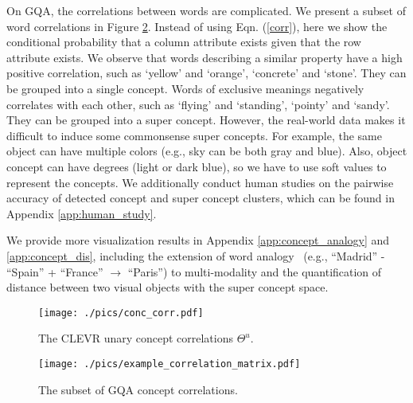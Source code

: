 \documentclass[10pt,twocolumn,letterpaper]{article}
\begin{document}
On GQA, the correlations between words are complicated. We present a subset of word correlations in Figure \ref{conc_corr_gqa}. Instead of using Eqn. (\ref{corr}), here we show the conditional probability that a column attribute exists given that the row attribute exists. We observe that words describing a similar property have a high positive correlation, such as `yellow' and `orange', `concrete' and `stone'. They can be grouped into a single concept. Words of exclusive meanings negatively correlates with each other, such as `flying' and `standing', `pointy' and `sandy'. They can be grouped into a super concept. However, the real-world data makes it difficult to induce some commonsense super concepts. For example, the same object can have multiple colors (e.g., sky can be both gray and blue). Also, object concept can have degrees (light or dark blue), so we have to use soft values to represent the concepts. We additionally conduct human studies on the pairwise accuracy of detected concept and super concept clusters, which can be found in Appendix \ref{app:human_study}.


We provide more visualization results in Appendix \ref{app:concept_analogy} and  \ref{app:concept_dis}, including the extension of word analogy~\cite{mikolov2013distributed} (e.g., ``Madrid'' - ``Spain'' + ``France'' $\rightarrow$ ``Paris'') to multi-modality and the quantification of distance between two visual objects with the super concept space.




\begin{figure}[t]
\centering
\texttt{[image: ./pics/conc\_corr.pdf]}
\vspace{-3mm}
\caption{The CLEVR unary concept correlations $\Theta^u$.}
\label{conc_corr}
\vspace{-3mm}
\end{figure}

\begin{figure}[t]
\centering
\texttt{[image: ./pics/example\_correlation\_matrix.pdf]}
\vspace{-3mm}
\caption{The subset of GQA concept correlations.}
\label{conc_corr_gqa}
\vspace{-5mm}
\end{figure}
\vspace{-3mm}
\end{document}
